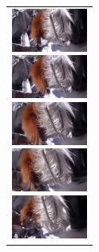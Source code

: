 \begin{figure}[H]
    \begin{tabular}{l}

\\ %
      \begin{minipage}{0.165\hsize}
        \begin{center}
          \includegraphics[clip, width=2.5cm]{./Figures/still_sniffcling1.eps}
        \end{center}
      \end{minipage}
      \begin{minipage}{0.165\hsize}
        \begin{center}
          \includegraphics[clip, width=2.5cm]{./Figures/still_sniffcling2.eps}
        \end{center}
      \end{minipage}
      \begin{minipage}{0.165\hsize}
        \begin{center}
          \includegraphics[clip, width=2.5cm]{./Figures/still_sniffcling3.eps}
        \end{center}
      \end{minipage}
      \begin{minipage}{0.165\hsize}
        \begin{center}
          \includegraphics[clip, width=2.5cm]{./Figures/still_sniffcling4.eps}
        \end{center}
      \end{minipage}
      \begin{minipage}{0.165\hsize}
        \begin{center}
          \includegraphics[clip, width=2.5cm]{./Figures/still_sniffcling5.eps}

\end{center}
\end{minipage}
\end{tabular}
\end{figure}
